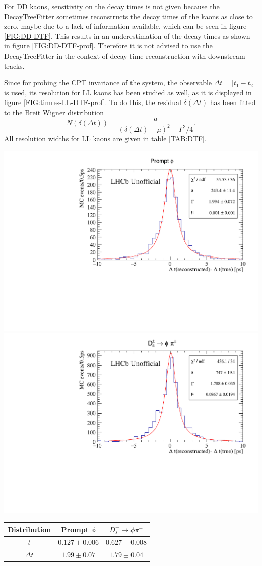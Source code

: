 For DD kaons, sensitivity on the decay times is not given because the DecayTreeFitter sometimes reconstructs the decay times of the kaons as close to zero, maybe due to a lack of information available, which can be seen in figure \ref{FIG:DD-DTF}. This results in an underestimation of the decay times as shown in figure \ref{FIG:DD-DTF-prof}.
Therefore it is not advised to use the DecayTreeFitter in the context of decay time reconstruction with downstream tracks.

Since for probing the CPT invariance of the system, the observable $\Delta t = |t_1 - t_2|$ is used, its resolution for LL kaons has been studied as well, as it is displayed in figure \ref{FIG:timres-LL-DTF-prof}. To do this, the residual $\delta(\Delta t)$ has been fitted to the Breit Wigner distribution 
\begin{equation}
N(\delta(\Delta t)) = \frac{a}{(\delta(\Delta t)- \mu)^2 - \Gamma^2/4}. \label{EQ:BWdeltat}
\end{equation}
All resolution widths for LL kaons are given in table \ref{TAB:DTF}.
\begin{center}
\includegraphics[width=.49\textwidth]{figs/time_res_incl/timeResolution-DeltaTauLL-DTF.pdf}
\includegraphics[width=.49\textwidth]{figs/time_res_Ds/timeResolution-DeltaTauLL-DTF.pdf}
\label{FIG:timres-LL-DTF-prof}
\end{center}

\begin{center}
\begin{tabular}{c|cc}
Distribution & Prompt $\phi$ & $D_s^\pm \rightarrow \phi \pi^\pm$ \\ 
\hline 
$t$ & $0.127\pm0.006$  & $0.627\pm0.008$ \\ 
$\Delta t$ & $1.99 \pm 0.07$ & $1.79 \pm 0.04$ \\ 
\end{tabular} 
 \label{TAB:DTF}
\end{center}

